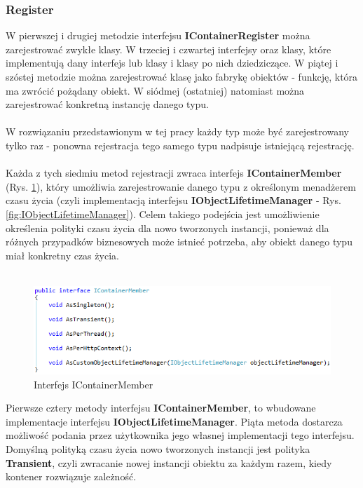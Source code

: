 \documentclass[12pt]{article}
\begin{document}
\subsubsection{Register}
W pierwszej i drugiej metodzie interfejsu \textbf{IContainerRegister} można zarejestrować zwykłe klasy. W trzeciej i czwartej interfejsy oraz klasy, które implementują dany interfejs lub klasy i klasy po nich dziedziczące. W piątej i szóstej metodzie można zarejestrować klasę jako fabrykę obiektów - funkcję, która ma zwrócić pożądany obiekt. W siódmej (ostatniej) natomiast można zarejestrować konkretną instancję danego typu.\\
\\
W rozwiązaniu przedstawionym w tej pracy każdy typ może być zarejestrowany tylko raz - ponowna rejestracja tego samego typu nadpisuje istniejącą rejestrację.\\
\\
Każda z tych siedmiu metod rejestracji zwraca interfejs \textbf{IContainerMember} (Rys. \ref{fig:IContainerMember}), który umożliwia zarejestrowanie danego typu z określonym menadżerem czasu życia (czyli implementacją interfejsu \textbf{IObjectLifetimeManager} - Rys. \ref{fig:IObjectLifetimeManager}). Celem takiego podejścia jest umożliwienie określenia polityki czasu życia dla nowo tworzonych instancji, ponieważ dla różnych przypadków biznesowych może istnieć potrzeba, aby obiekt danego typu miał konkretny czas życia.\\ \\
\begin{figure}[H]
	\begin{center}
  		\includegraphics{IContainerMember.png}
  		\caption{Interfejs IContainerMember}
  		\label{fig:IContainerMember}
	\end{center}
\end{figure}
Pierwsze cztery metody interfejsu \textbf{IContainerMember}, to wbudowane implementacje interfejsu \textbf{IObjectLifetimeManager}. Piąta metoda dostarcza możliwość podania przez użytkownika jego własnej implementacji tego interfejsu. Domyślną polityką czasu życia nowo tworzonych instancji jest polityka \textbf{Transient}, czyli zwracanie nowej instancji obiektu za każdym razem, kiedy kontener rozwiązuje zależność.\\
\end{document}
